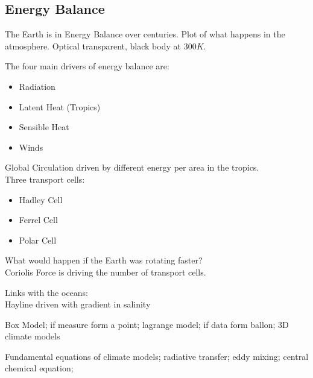 \documentclass[12pt, a4paper]{article} %
\begin{document}
\subsection{Energy Balance}

The Earth is in Energy Balance over centuries. Plot of what happens in the atmosphere. Optical transparent, black body at $300K$.

The four main drivers of energy balance are:
\begin{itemize}
	\item Radiation
	\item Latent Heat (Tropics)
	\item Sensible Heat
	\item Winds
\end{itemize}

Global Circulation driven by different energy per area in the tropics. \\

Three transport cells:
\begin{itemize}
	\item Hadley Cell
	\item Ferrel Cell
	\item Polar Cell
\end{itemize}
What would happen if the Earth was rotating faster? \\

Coriolis Force is driving the number of transport cells.

Links with the oceans: \\

Hayline driven with gradient in salinity

Box Model; if measure form a point; lagrange model; if data form ballon; 3D climate models

Fundamental equations of climate models; radiative transfer; eddy mixing; central chemical equation;
\end{document}
